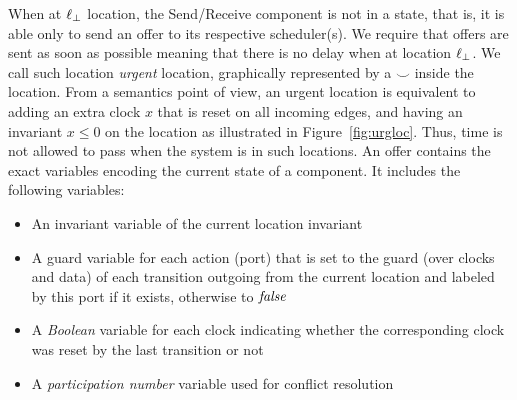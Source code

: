 When at $\ell_{\perp}$ location, the Send/Receive component is not in a  state, that is,
it is able only to send an offer to its respective scheduler(s). 
We require that offers are sent as soon as 
possible meaning that there is no delay when at location $\ell_{\perp}$. We call such location
\emph{urgent} location, graphically represented by a $\smile$ inside the location. 
From a semantics point of view, an urgent location is equivalent to adding an extra clock
$x$ that is reset on all incoming edges, and having an invariant $x\le0$ on the location 
as illustrated in Figure~\ref{fig:urgloc}. Thus, time is not allowed to pass when the system 
is in such locations.  
An offer contains the exact variables encoding the current state of a component. It includes
the following variables:
\begin{itemize}
  \item An invariant variable of the current location invariant 
  \item A guard variable for each action (port) that is set to the guard (over clocks and data)
    of each transition outgoing from the current location and labeled by this port if it exists, 
    otherwise to $\textnormal{\textit{false}}$
  \item A \emph{Boolean} variable for each clock indicating whether the corresponding clock 
    was reset by the last transition or not 
  \item A \emph{participation number} variable used for conflict resolution
\end{itemize}


